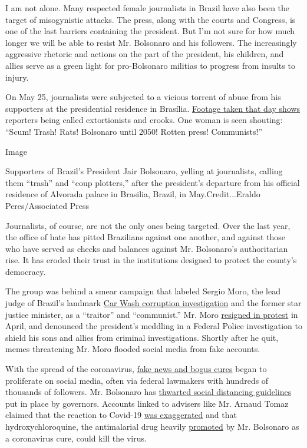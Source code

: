 I am not alone. Many respected female journalists in Brazil have also
been the target of misogynistic attacks. The press, along with the
courts and Congress, is one of the last barriers containing the
president. But I'm not sure for how much longer we will be able to
resist Mr. Bolsonaro and his followers. The increasingly aggressive
rhetoric and actions on the part of the president, his children, and
allies serve as a green light for pro-Bolsonaro militias to progress
from insults to injury.

On May 25, journalists were subjected to a vicious torrent of abuse from
his supporters at the presidential residence in Brasília.
\href{https://twitter.com/folha/status/1264913877399212034}{Footage
taken that day shows} reporters being called extortionists and crooks.
One woman is seen shouting: ``Scum! Trash! Rats! Bolsonaro until 2050!
Rotten press! Communists!''

Image

Supporters of Brazil's President Jair Bolsonaro, yelling at journalists,
calling them ``trash'' and ``coup plotters,'' after the president's
departure from his official residence of Alvorada palace in Brasilia,
Brazil, in May.Credit...Eraldo Peres/Associated Press

Journalists, of course, are not the only ones being targeted. Over the
last year, the office of hate has pitted Brazilians against one another,
and against those who have served as checks and balances against Mr.
Bolsonaro's authoritarian rise. It has eroded their trust in the
institutions designed to protect the county's democracy.

The group was behind a smear campaign that labeled Sergio Moro, the lead
judge of Brazil's landmark
\href{https://www.nytimes.com/2017/09/18/opinion/brazil-corruption-car-wash.html?searchResultPosition=1}{Car
Wash corruption investigation} and the former star justice minister, as
a ``traitor'' and ``communist.'' Mr. Moro
\href{https://www.nytimes.com/2020/04/24/world/americas/brazil-bolsonaro-moro.html}{resigned
in protest} in April, and denounced the president's meddling in a
Federal Police investigation to shield his sons and allies from criminal
investigations. Shortly after he quit, memes threatening Mr. Moro
flooded social media from fake accounts.

With the spread of the coronavirus,
\href{https://www.bbc.com/news/53361876}{fake news and bogus cures}
began to proliferate on social media, often via federal lawmakers with
hundreds of thousands of followers. Mr. Bolsonaro has
\href{https://www.hrw.org/news/2020/04/10/brazil-bolsonaro-sabotages-anti-covid-19-efforts}{thwarted
social distancing guidelines} put in place by governors. Accounts linked
to advisers like Mr. Arnaud Tomaz claimed that the reaction to Covid-19
\href{https://www.bbc.com/portuguese/brasil-53353594}{was exaggerated}
and that hydroxychloroquine, the antimalarial drug heavily
\href{https://www.nytimes.com/2020/06/13/world/americas/virus-brazil-bolsonaro-chloroquine.html}{promoted}
by Mr. Bolsonaro as a coronavirus cure, could kill the virus.

